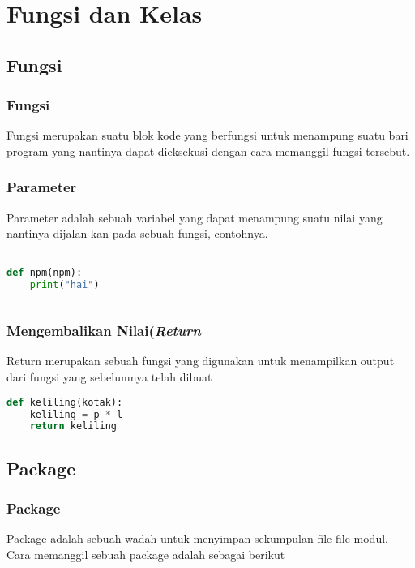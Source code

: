 \chapter{Fungsi dan Kelas}
\section{Fungsi}
\subsection{Fungsi}
\par 
Fungsi merupakan suatu blok kode yang berfungsi untuk menampung suatu bari program yang nantinya dapat dieksekusi dengan cara memanggil fungsi tersebut.

\subsection{Parameter}
\par
Parameter adalah sebuah variabel yang dapat menampung suatu nilai yang nantinya dijalan kan pada sebuah fungsi, contohnya.

\begin{lstlisting}[language=Python]

def npm(npm):
	print("hai")
	
\end{lstlisting}

\subsection{Mengembalikan Nilai(\textit{Return}}
\par
Return merupakan sebuah fungsi yang digunakan untuk menampilkan output dari fungsi yang sebelumnya telah dibuat

\begin{lstlisting}[language=Python]
def keliling(kotak):
	keliling = p * l
	return keliling 
\end{lstlisting}

\section{Package}
\subsection{Package}
Package adalah sebuah wadah untuk menyimpan sekumpulan file-file modul.
Cara memanggil sebuah package adalah sebagai berikut

